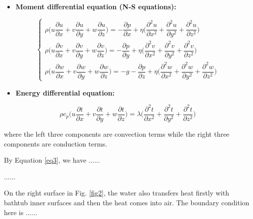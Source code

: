 \documentclass{mcmthesis}
\begin{document}
\begin{itemize}
\item {\bf Moment differential equation (N-S equations):}
\end{itemize}

\begin{equation} \label{eq2}
\left\{
\begin{array}{l} \!\!
\rho \Big(u \dfrac{\partial u}{\partial x} + v \dfrac{\partial u}{\partial y} + 
w\dfrac{\partial u}{\partial z} \Big) = -\dfrac{\partial p}{\partial x} + 
\eta \Big(\dfrac{\partial^2 u}{\partial x^2} + \dfrac{\partial^2 u}{\partial y^2} + 
\dfrac{\partial^2 u}{\partial z^2} \Big) \\[0.3cm]
\rho \Big(u \dfrac{\partial v}{\partial x} + v \dfrac{\partial v}{\partial y} + 
w\dfrac{\partial v}{\partial z} \Big) = -\dfrac{\partial p}{\partial y} + 
\eta \Big(\dfrac{\partial^2 v}{\partial x^2} + \dfrac{\partial^2 v}{\partial y^2} + 
\dfrac{\partial^2 v}{\partial z^2} \Big) \\[0.3cm]
\rho \Big(u \dfrac{\partial w}{\partial x} + v \dfrac{\partial w}{\partial y} +
w\dfrac{\partial w}{\partial z} \Big) = -g-\dfrac{\partial p}{\partial z} + 
\eta \Big(\dfrac{\partial^2 w}{\partial x^2} + \dfrac{\partial^2 w}{\partial y^2} + 
\dfrac{\partial^2 w}{\partial z^2} \Big)  
\end{array}
\right.
\end{equation}

\begin{itemize}
\item {\bf Energy differential equation:}
\end{itemize}

\begin{equation} \label{eq3}
\rho c_p \Big( u\frac{\partial t}{\partial x} + v\frac{\partial t}{\partial y} + 
w\frac{\partial t}{\partial z} \Big) = \lambda \Big(\frac{\partial^2 t}{\partial x^2} + 
\frac{\partial^2 t}{\partial y^2} + \frac{\partial^2 t}{\partial z^2} \Big)
\end{equation}

\noindent where the left three components are convection terms while the right 
three components are conduction terms.

By Equation \eqref{eq3}, we have ......

......

On the right surface in Fig. \ref{fig2}, the water also transfers heat firstly 
with bathtub inner surfaces and then the heat comes into air. The boundary 
condition here is ......
\end{document}
